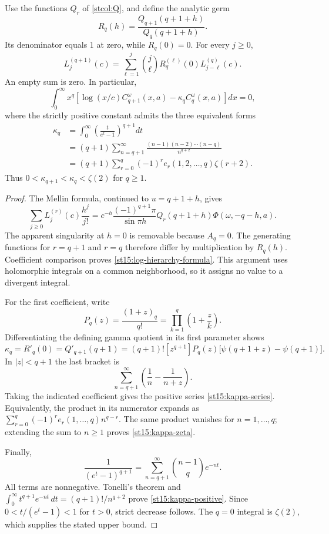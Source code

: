 \begin{proposition}
\label{st15:log-hierarchy}
Use the functions $Q_r$ of \eqref{stcol:Q}, and define the analytic germ
\[
 R_q(h)=\frac{Q_{q+1}(q+1+h)}{Q_q(q+1+h)}.
\]
Its denominator equals $1$ at zero, while $R_q(0)=0$.  For every
$j\ge0$,
\begin{equation}\label{st15:log-hierarchy-formula}
 L_j^{(q+1)}(c)
   =\sum_{\ell=1}^j\binom j\ell
           R_q^{(\ell)}(0)L_{j-\ell}^{(q)}(c).
\end{equation}
An empty sum is zero.  In particular,
\begin{equation}\label{st15:log-vanishing}
 \boxed{\displaystyle
 \int_0^\infty x^q\left[
      \log(x/c)C_{q+1}^\omega(x,a)-\kappa_q C_q^\omega(x,a)
                      \right]dx=0,}
\end{equation}
where the strictly positive constant admits the three equivalent forms
\begin{align}
 \kappa_q
 &=\int_0^\infty\left(\frac{t}{e^t-1}\right)^{q+1}dt
       \label{st15:kappa-positive}\\
 &=(q+1)\sum_{n=q+1}^\infty
          \frac{(n-1)(n-2)\cdots(n-q)}{n^{q+2}}
       \label{st15:kappa-series}\\
 &=(q+1)\sum_{r=0}^q(-1)^r e_r(1,2,\ldots,q)\zeta(r+2).
       \label{st15:kappa-zeta}
\end{align}
Thus $0<\kappa_{q+1}<\kappa_q<\zeta(2)$ for $q\ge1$.
\end{proposition}
\begin{proof}
The Mellin formula, continued to $u=q+1+h$, gives
\[
 \sum_{j\ge0}L_j^{(r)}(c)\frac{h^j}{j!}
   =c^{-h}\frac{(-1)^{q+1}\pi}{\sin\pi h}
         Q_r(q+1+h)\Phi(\omega,-q-h,a).
\]
The apparent singularity at $h=0$ is removable because $A_q=0$.
The generating functions for $r=q+1$ and $r=q$ therefore differ
by multiplication by $R_q(h)$.  Coefficient comparison proves
\eqref{st15:log-hierarchy-formula}.  This argument uses holomorphic
integrals on a common neighborhood, so it assigns no value to a
divergent integral.

For the first coefficient, write
\[
 P_q(z)=\frac{(1+z)_q}{q!}
       =\prod_{k=1}^q\left(1+\frac zk\right).
\]
Differentiating the defining gamma quotient in its first parameter shows
\[
 \kappa_q=R'_q(0)=Q'_{q+1}(q+1)
  =(q+1)![z^{q+1}]P_q(z)
       \bigl[\psi(q+1+z)-\psi(q+1)\bigr].
\]
In $|z|<q+1$ the last bracket is
\[
 \sum_{n=q+1}^\infty\left(\frac1n-\frac1{n+z}\right).
\]
Taking the indicated coefficient gives the positive series
\eqref{st15:kappa-series}.  Equivalently, the product in its numerator
expands as $\sum_{r=0}^q(-1)^r e_r(1,\ldots,q)n^{q-r}$.
The same product vanishes for $n=1,\ldots,q$; extending the sum to
$n\ge1$ proves \eqref{st15:kappa-zeta}.

Finally,
\[
 \frac1{(e^t-1)^{q+1}}
     =\sum_{n=q+1}^\infty\binom{n-1}{q}e^{-nt}.
\]
All terms are nonnegative.  Tonelli's theorem and
$\int_0^\infty t^{q+1}e^{-nt}\,dt=(q+1)!/n^{q+2}$
prove \eqref{st15:kappa-positive}.  Since $0<t/(e^t-1)<1$
for $t>0$, strict decrease follows.  The $q=0$ integral is $\zeta(2)$,
which supplies the stated upper bound.
\end{proof}

